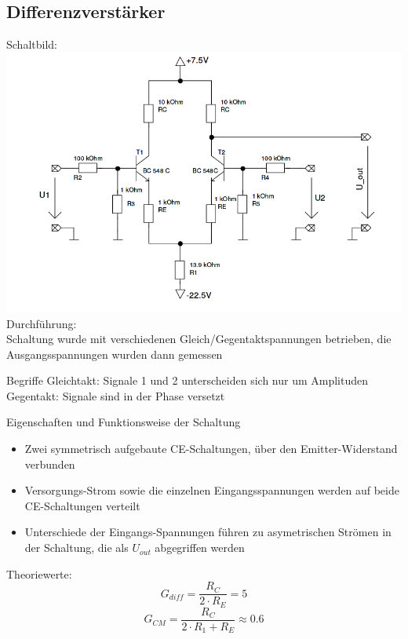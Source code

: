 \documentclass[compress,11pt]{beamer}
\begin{document}
\subsection{Differenzverstärker}
\begin{frame}
Schaltbild:\\

\includegraphics[width=.7\textwidth]{schaltbilder/schalt_3c}\\
Durchführung:\\
Schaltung wurde mit verschiedenen Gleich/Gegentaktspannungen betrieben, die Ausgangsspannungen wurden dann gemessen
\end{frame}
\begin{frame}
\begin{block}{Begriffe}
Gleichtakt: Signale 1 und 2 unterscheiden sich nur um Amplituden
Gegentakt: Signale sind in der Phase versetzt
\end{block}
\end{frame}
\begin{frame}
\begin{block}{Eigenschaften und Funktionsweise der Schaltung}
\begin{itemize}
\item Zwei symmetrisch aufgebaute CE-Schaltungen, über den Emitter-Widerstand verbunden
\item Versorgungs-Strom sowie die einzelnen Eingangsspannungen werden auf beide CE-Schaltungen verteilt
\item Unterschiede der Eingangs-Spannungen führen zu asymetrischen Strömen in der Schaltung, die als $U_{out}$ abgegriffen werden
\end{itemize}
\end{block}
\end{frame}
\begin{frame}
Theoriewerte:
\begin{equation}
G_{diff} = \frac{R_C}{2 \cdot R_E} = 5
\end{equation}
\begin{equation}
G_{CM} = \frac{R_C}{2 \cdot R_1 + R_E} \approx 0.6
\end{equation}
\end{frame}
\end{document}
